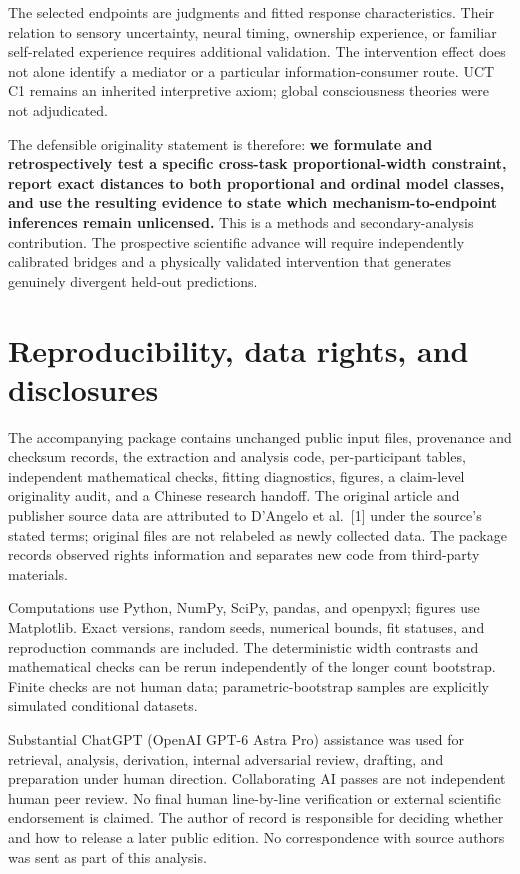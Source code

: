 \documentclass[
  11pt,
]{article}
\let\ctdoldsection\section
\renewcommand{\section}{\Needspace{8\baselineskip}\ctdoldsection}
\begin{document}
The selected endpoints are judgments and fitted response
characteristics. Their relation to sensory uncertainty, neural timing,
ownership experience, or familiar self-related experience requires
additional validation. The intervention effect does not alone identify a
mediator or a particular information-consumer route. UCT C1 remains an
inherited interpretive axiom; global consciousness theories were not
adjudicated.

The defensible originality statement is therefore: \textbf{we formulate
and retrospectively test a specific cross-task proportional-width
constraint, report exact distances to both proportional and ordinal
model classes, and use the resulting evidence to state which
mechanism-to-endpoint inferences remain unlicensed.} This is a methods
and secondary-analysis contribution. The prospective scientific advance
will require independently calibrated bridges and a physically validated
intervention that generates genuinely divergent held-out predictions.

\hypertarget{reproducibility-data-rights-and-disclosures}{%
\section{Reproducibility, data rights, and
disclosures}\label{reproducibility-data-rights-and-disclosures}}

The accompanying package contains unchanged public input files,
provenance and checksum records, the extraction and analysis code,
per-participant tables, independent mathematical checks, fitting
diagnostics, figures, a claim-level originality audit, and a Chinese
research handoff. The original article and publisher source data are
attributed to D'Angelo et al.~{[}1{]} under the source's stated terms;
original files are not relabeled as newly collected data. The package
records observed rights information and separates new code from
third-party materials.

Computations use Python, NumPy, SciPy, pandas, and openpyxl; figures use
Matplotlib. Exact versions, random seeds, numerical bounds, fit
statuses, and reproduction commands are included. The deterministic
width contrasts and mathematical checks can be rerun independently of
the longer count bootstrap. Finite checks are not human data;
parametric-bootstrap samples are explicitly simulated conditional
datasets.

Substantial ChatGPT (OpenAI GPT-6 Astra Pro) assistance was used for
retrieval, analysis, derivation, internal adversarial review, drafting,
and preparation under human direction. Collaborating AI passes are not
independent human peer review. No final human line-by-line verification
or external scientific endorsement is claimed. The author of record is
responsible for deciding whether and how to release a later public
edition. No correspondence with source authors was sent as part of this
analysis.
\end{document}
